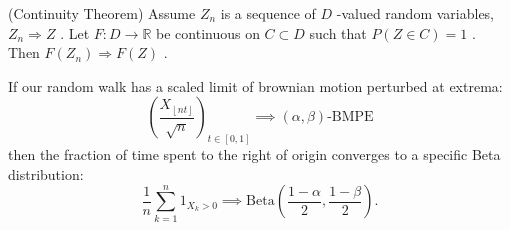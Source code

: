 
\begin{theorem}
(Continuity Theorem)  
	  Assume $Z_n$ is a sequence of $D$ -valued random variables, $Z_n \Rightarrow Z$ . Let $F: D \to \mathbb{R}$ be continuous on $C \subset D$ such that $P(Z \in C) = 1$ . Then $F(Z_n) \Rightarrow F(Z)$ .  
\end{theorem}
\begin{theorem}
	  If our random walk has a scaled limit of brownian motion perturbed at extrema:  
	  $$
	  \left(\frac{X_{\left\lfloor nt  \right\rfloor}}{\sqrt{n} }\right)_{t \in [0,1]} \implies (\alpha, \beta)\text{-BMPE}
	  $$  
	  then the fraction of time spent to the right of origin converges to a specific Beta distribution:  
	  $$
	  	\frac{1}{n} \sum_{k=1}^{n} 1_{X_k > 0} \implies \text{Beta}\left( \frac{1-\alpha}{2}, \frac{1-\beta}{2} \right) 
	  .$$  
\end{theorem}
